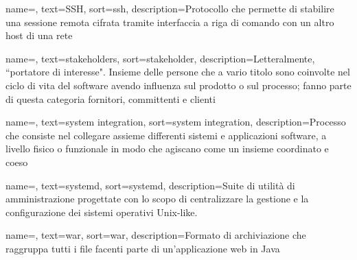 {
    name=,
    text=SSH,
    sort=ssh,
    description={Protocollo che permette di stabilire una sessione remota cifrata tramite interfaccia a riga di comando con un altro host di una rete}
}

{
    name=,
    text=stakeholders,
    sort=stakeholder,
    description={Letteralmente, ``portatore di interesse". Insieme delle persone che a vario titolo sono coinvolte nel ciclo di vita del software avendo influenza sul prodotto o sul processo; fanno parte di questa categoria fornitori, committenti e clienti}
}

{
    name=,
    text=system integration,
    sort=system integration,
    description={Processo che consiste nel collegare assieme differenti sistemi e applicazioni software, a livello fisico o funzionale in modo che agiscano come un insieme coordinato e coeso}
}

{
    name=,
    text=systemd,
    sort=systemd,
    description={Suite di utilità di amministrazione progettate con lo scopo di centralizzare la gestione e la configurazione dei sistemi operativi Unix-like.}
}

{
    name=,
    text=war,
    sort=war,
    description={Formato di archiviazione che raggruppa tutti i file facenti parte di un'applicazione web in Java}
}